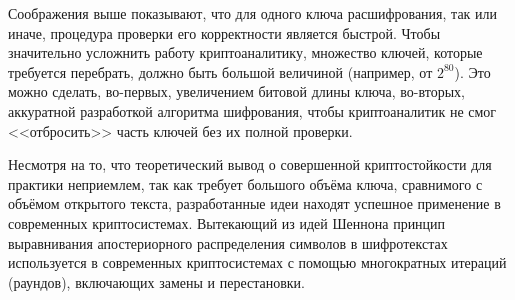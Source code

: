 Соображения выше показывают, что для одного ключа расшифрования, так или иначе, процедура проверки его корректности является быстрой. Чтобы значительно усложнить работу криптоаналитику, множество ключей, которые требуется перебрать, должно быть большой величиной (например, от $2^{80}$). Это можно сделать, во-первых, увеличением битовой длины ключа, во-вторых, аккуратной разработкой алгоритма шифрования, чтобы криптоаналитик не смог <<отбросить>> часть ключей без их полной проверки.

Несмотря на то, что теоретический вывод о совершенной криптостойкости для практики неприемлем, так как требует большого объёма ключа, сравнимого с объёмом открытого текста, разработанные идеи находят успешное применение в современных криптосистемах. Вытекающий из идей Шеннона принцип выравнивания апостериорного распределения символов в шифротекстах используется в современных криптосистемах с помощью многократных итераций (раундов), включающих замены и перестановки.
